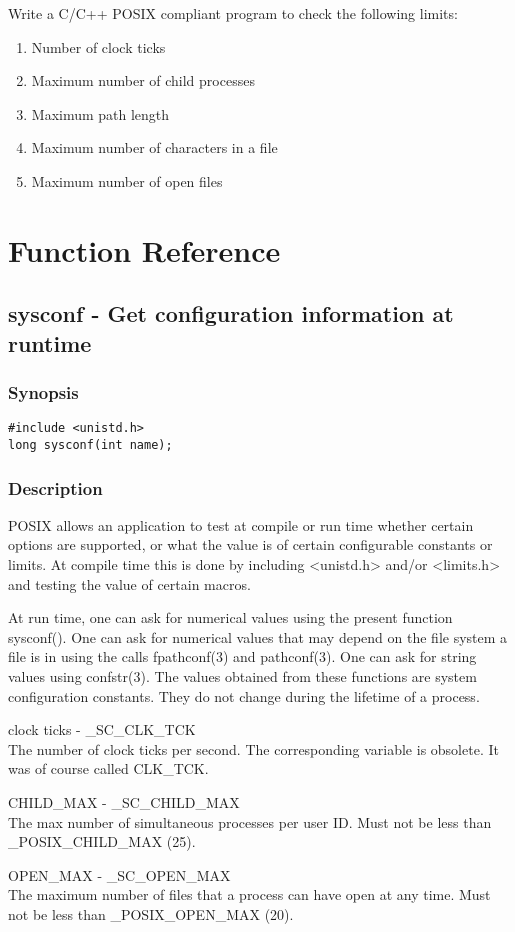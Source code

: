 Write a C/C++ POSIX compliant program to check the following limits:
\begin{enumerate}
	\item Number of clock ticks
	\item Maximum number of child processes
	\item Maximum path length
	\item Maximum number of characters in a file
	\item Maximum number of open files
\end{enumerate}

\section{Function Reference}

\subsection{sysconf - Get configuration information at runtime}

\subsubsection{Synopsis}

\begin{lstlisting}
#include <unistd.h>
long sysconf(int name);
\end{lstlisting}

\subsubsection{Description}

POSIX allows an application to test at compile or run time whether certain options are supported, or what the value is of certain configurable constants or limits. At compile time this is done by including <unistd.h> and/or <limits.h> and testing the value of certain macros.

At run time, one can ask for numerical values using the present function sysconf(). One can ask for numerical values that may depend on the file system a file is in using the calls fpathconf(3) and pathconf(3). One can ask for string values using confstr(3). The values obtained from these functions are system configuration constants. They do not change during the lifetime of a process.

\begin{description}
	\item clock ticks - \_SC\_CLK\_TCK \hfill \\
		The number of clock ticks per second.  The corresponding variable is obsolete.  It  was  of  course  called  CLK\_TCK.
	\item CHILD\_MAX - \_SC\_CHILD\_MAX \hfill \\
		The max number of simultaneous processes per user ID.  Must not be less than \_POSIX\_CHILD\_MAX (25).
	\item OPEN\_MAX - \_SC\_OPEN\_MAX \hfill \\
		The maximum number of files that a process can have open at any time.  Must not be less than \_POSIX\_OPEN\_MAX (20).
\end{description}

